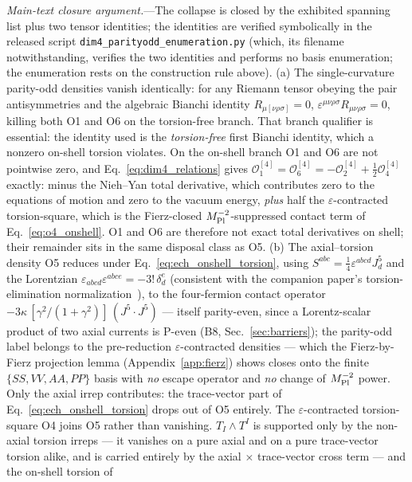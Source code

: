 \documentclass[aps,prd,twocolumn,superscriptaddress,showpacs,preprintnumbers,nofootinbib,longbibliography,floatfix]{revtex4-2}
\newcommand{\MPl}{M_{\rm Pl}}
\begin{document}
\emph{Main-text closure argument.}---The collapse is closed by the
exhibited spanning list plus two tensor identities; the identities are
verified symbolically in the released script
\texttt{dim4\_parityodd\_enumeration.py} (which, its
filename notwithstanding, verifies the two identities and performs no
basis enumeration; the enumeration rests on the
construction rule above). (a) The single-curvature
parity-odd densities vanish identically: for any Riemann tensor obeying the
pair antisymmetries and the algebraic Bianchi identity $R_{\mu[\nu\rho\sigma]}=0$,
$\varepsilon^{\mu\nu\rho\sigma}R_{\mu\nu\rho\sigma}=0$, killing both O1 and O6
on the torsion-free branch. That branch qualifier is essential: the
identity used is the \emph{torsion-free} first Bianchi identity, which a
nonzero on-shell torsion violates. On the on-shell branch O1 and O6 are not
pointwise zero, and Eq.~\eqref{eq:dim4_relations} gives
$\mathcal{O}_1^{[4]}=\mathcal{O}_6^{[4]}
=-\mathcal{O}_2^{[4]}+\tfrac12\mathcal{O}_4^{[4]}$ exactly: minus the
Nieh--Yan total derivative, which contributes zero to the
equations of motion and zero to the vacuum energy, \emph{plus} half the
$\varepsilon$-contracted torsion-square, which is the Fierz-closed
$\MPl^{-2}$-suppressed contact term of Eq.~\eqref{eq:o4_onshell}. O1 and
O6 are therefore not exact total derivatives on shell; their remainder
sits in the same disposal class as O5. (b) The axial--torsion density O5
reduces under Eq.~\eqref{eq:ech_onshell_torsion},
using $S^{abc}=\tfrac14\varepsilon^{abcd}J^5_d$ and the
Lorentzian $\varepsilon_{abcd}\varepsilon^{abce}=-3!\,\delta^e_d$
(consistent with the
companion paper's torsion-elimination normalization~\cite{Golden2026P1a}), to the
four-fermion contact operator
$-3\kappa\,[\gamma^2/(1+\gamma^2)]\,(J^5\!\cdot\!J^5)$ --- itself
parity-even, since a Lorentz-scalar product of two axial currents is
P-even (B8, Sec.~\ref{sec:barriers}); the parity-odd label belongs to
the pre-reduction $\varepsilon$-contracted densities --- which the
Fierz-by-Fierz projection lemma (Appendix~\ref{app:fierz}) shows closes onto
the finite $\{SS,VV,AA,PP\}$ basis with \emph{no} escape operator and \emph{no}
change of $\MPl^{-2}$ power. Only the axial irrep contributes: the
trace-vector part of Eq.~\eqref{eq:ech_onshell_torsion} drops out of O5
entirely. The $\varepsilon$-contracted torsion-square
O4 joins O5 rather than vanishing. $T_I\wedge T^I$ is supported only by the
non-axial torsion irreps --- it vanishes on a pure axial and on a pure
trace-vector torsion alike, and is carried entirely by the
axial$\,\times\,$trace-vector cross term --- and the on-shell torsion of
\end{document}
